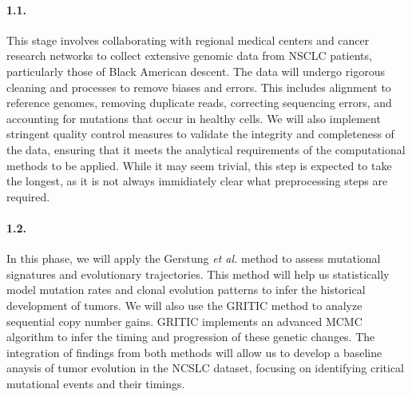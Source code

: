 \paragraph{1.1. \SpecificAimOneA}

This stage involves collaborating with regional medical centers and 
cancer research networks to collect extensive genomic data from NSCLC patients, 
particularly those of Black American descent. 
The data will undergo rigorous cleaning and processes to remove biases and errors. 
This includes alignment to reference genomes, removing duplicate reads, correcting sequencing errors, 
and accounting for mutations that occur in healthy cells. 
We will also implement stringent quality control measures to validate the integrity and completeness of the data, 
ensuring that it meets the analytical requirements of the computational methods to be applied.
While it may seem trivial, this step is expected to take the longest, 
as it is not always immidiately clear what preprocessing steps are required. 

\paragraph{1.2. \SpecificAimOneB}

In this phase, we will apply the Gerstung \textit{et al.} method to assess mutational signatures and evolutionary trajectories. 
This method will help us statistically model mutation rates and clonal evolution patterns to infer the historical development of tumors. 
We will also use the GRITIC method to analyze sequential copy number gains. 
GRITIC implements an advanced MCMC algorithm to infer the timing and progression of these genetic changes. 
The integration of findings from both methods will allow us to develop a baseline anaysis of tumor evolution in the NCSLC dataset, 
focusing on identifying critical mutational events and their timings.

